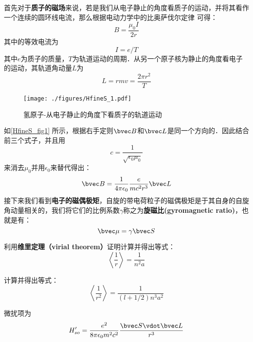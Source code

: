 首先对于\textbf{质子的磁场}来说，若是我们从电子静止的角度看质子的运动，并将其看作一个连续的圆环线电流，那么根据电动力学中的比奥萨伐尔定律 可得：
\begin{equation}
B=\frac{\mu_0I}{2r}
\end{equation}
其中的等效电流为
\begin{equation}
I=e/T
\end{equation}
其中$e$为质子的质量，$T$为轨道运动的周期．从另一个原子核为静止的角度看电子的运动，其轨道角动量$L$为
\begin{equation}
L=rmv=\frac{2\pi r^2}{T}
\end{equation}
\begin{figure}[ht]
\centering
\texttt{[image: ./figures/HfineS\_1.pdf]}
\caption{氢原子-从电子静止的角度下看质子的轨道运动} \label{HfineS_fig1}
\end{figure}
如\autoref{HfineS_fig1} 所示，根据右手定则$\bvec B$和$\bvec L$是同一个方向的．因此结合前三个式子，并且用
\begin{equation}
c=\frac{1}{\sqrt{\epsilon_0\mu_0}}
\end{equation}
来消去$\mu_0$并用$\epsilon_0$来替代得出：
\begin{equation}
\bvec B = \frac{1}{4\pi\epsilon_0}\frac{e}{mc^2r^3}\bvec L
\end{equation}
接下来我们看到\textbf{电子的磁偶极矩}，自旋的带电荷粒子的磁偶极矩是于其自身的自旋角动量相关的，我们将它们的比例系数$\gamma$称之为\textbf{旋磁比(gyromagnetic
ratio)}，也就是有：
\begin{equation}
\bvec\mu=\gamma\bvec S
\end{equation}


\begin{exercise}{}\label{HfineS_exe1}
利用\textbf{维里定理（virial theorem）}证明计算并得出等式：
\begin{equation}
\left\langle\frac{1}{r}\right\rangle = \frac{1}{n^2a}
\end{equation}
\end{exercise}
\begin{exercise}{}\label{HfineS_exe2}
计算并得出等式：
\begin{equation}
\left\langle \frac{1}{r^2}\right\rangle = \frac{1}{(l+1/2)n^3a^2}
\end{equation}
\end{exercise}
微扰项为
\begin{equation}
H'_{so} = \frac{e^2}{8\pi \epsilon_0 m^2 c^2} \frac{\bvec S \vdot \bvec L}{r^3}
\end{equation}
